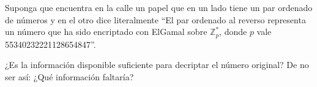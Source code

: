 
Suponga que encuentra en la calle un papel que en un lado tiene un par ordenado de números y en el otro dice literalmente ``El par ordenado al reverso representa un número que ha sido encriptado con ElGamal sobre $\mathbb{Z}_p^*$, donde $p$ vale 55340232221128654847''.

¿Es la información disponible suficiente para decriptar el número original? De no ser así: ¿Qué información faltaría?
